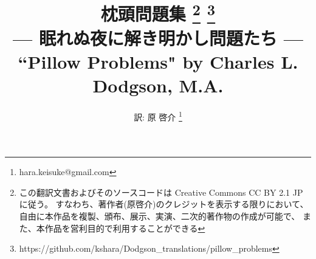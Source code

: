 \documentclass{book}
\begin{document}
\title{枕頭問題集
    \footnote{この翻訳文書およびそのソースコードは
    Creative Commons CC BY 2.1 JP に従う。
    すなわち、著作者(原啓介)のクレジットを表示する限りにおいて、
    自由に本作品を複製、頒布、展示、実演、二次的著作物の作成が可能で、
    また、本作品を営利目的で利用することができる}
    \footnote{https://github.com/kshara/Dodgson\_translations/pillow\_problems}
    \\
    {\normalsize --- 眠れぬ夜に解き明かし問題たち ---}
    \\
    ``Pillow Problems" by Charles L. Dodgson, M.A.
}
\author{訳: 原 啓介
    \footnote{hara.keisuke@gmail.com}
}
\maketitle

\tableofcontents






\end{document}
